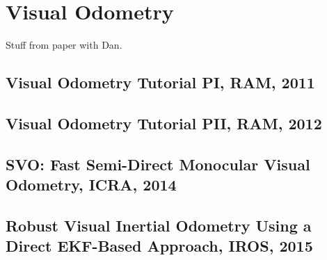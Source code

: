 
\chapter{Visual Odometry}
\label{chap:visual_odometry}

Stuff from paper with Dan.


\section{Visual Odometry Tutorial PI, RAM, 2011}


\section{Visual Odometry Tutorial PII, RAM, 2012}



\section{SVO: Fast Semi-Direct Monocular Visual Odometry, ICRA, 2014}


\section{Robust Visual Inertial Odometry Using a Direct EKF-Based Approach, IROS, 2015}

